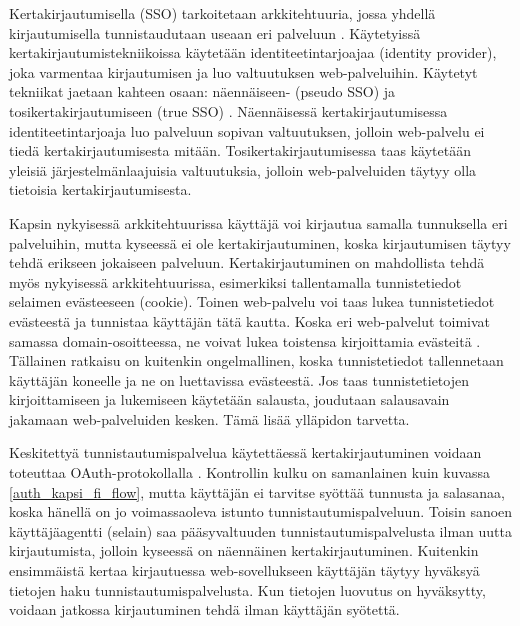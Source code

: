 Kertakirjautumisella (SSO) tarkoitetaan arkkitehtuuria, jossa yhdellä kirjautumisella tunnistaudutaan useaan eri palveluun \cite{sso}. Käytetyissä kertakirjautumistekniikoissa käytetään identiteetintarjoajaa (identity provider), joka varmentaa kirjautumisen ja luo valtuutuksen web-palveluihin. Käytetyt tekniikat jaetaan kahteen osaan: näennäiseen- (pseudo SSO) ja tosikertakirjautumiseen (true SSO) \cite{sso}. Näennäisessä kertakirjautumisessa identiteetintarjoaja luo palveluun sopivan valtuutuksen, jolloin web-palvelu ei tiedä kertakirjautumisesta mitään. Tosikertakirjautumisessa taas käytetään yleisiä järjestelmänlaajuisia valtuutuksia, jolloin web-palveluiden täytyy olla tietoisia kertakirjautumisesta.

Kapsin nykyisessä arkkitehtuurissa käyttäjä voi kirjautua samalla tunnuksella eri palveluihin, mutta kyseessä ei ole kertakirjautuminen, koska kirjautumisen täytyy tehdä erikseen jokaiseen palveluun. Kertakirjautuminen on mahdollista tehdä myös nykyisessä arkkitehtuurissa, esimerkiksi tallentamalla tunnistetiedot selaimen evästeeseen (cookie). Toinen web-palvelu voi taas lukea tunnistetiedot evästeestä ja tunnistaa käyttäjän tätä kautta. Koska eri web-palvelut toimivat samassa domain-osoitteessa, ne voivat lukea toistensa kirjoittamia evästeitä \cite{rfc6265}. Tällainen ratkaisu on kuitenkin ongelmallinen, koska tunnistetiedot tallennetaan käyttäjän koneelle ja ne on luettavissa evästeestä. Jos taas tunnistetietojen kirjoittamiseen ja lukemiseen käytetään salausta, joudutaan salausavain jakamaan web-palveluiden kesken. Tämä lisää ylläpidon tarvetta.

Keskitettyä tunnistautumispalvelua käytettäessä kertakirjautuminen voidaan toteuttaa OAuth-protokollalla \cite{distributed_web_security}. Kontrollin kulku on samanlainen kuin kuvassa \ref{auth_kapsi_fi_flow}, mutta käyttäjän ei tarvitse syöttää tunnusta ja salasanaa, koska hänellä on jo voimassaoleva istunto tunnistautumispalveluun. Toisin sanoen käyttäjäagentti (selain) saa pääsyvaltuuden tunnistautumispalvelusta ilman uutta kirjautumista, jolloin kyseessä on näennäinen kertakirjautuminen. Kuitenkin ensimmäistä kertaa kirjautuessa web-sovellukseen käyttäjän täytyy hyväksyä tietojen haku tunnistautumispalvelusta. Kun tietojen luovutus on hyväksytty, voidaan jatkossa kirjautuminen tehdä ilman käyttäjän syötettä.